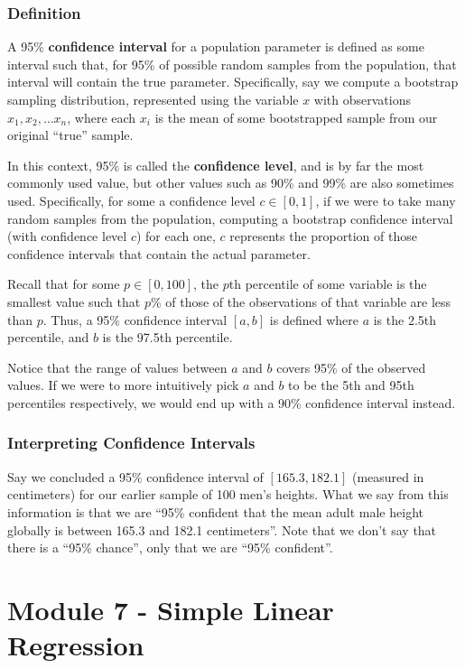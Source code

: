 \documentclass[10pt]{article}
\newenvironment{aside}{\begin{tcolorbox}[colframe=white,colback=_grey2,arc=0pt,outer arc=0pt,breakable]}{\end{tcolorbox}}
\begin{document}
\subsubsection{Definition}
A 95\% \textbf{confidence interval} for a population parameter is defined as some interval such that, for 95\% of possible random samples from the population, that interval will contain the true parameter. Specifically, say we compute a bootstrap sampling distribution, represented using the variable $x$ with observations $x_1,x_2,\dots x_n$, where each $x_i$ is the mean of some bootstrapped sample from our original ``true'' sample. 
\begin{aside}
    In this context, 95\% is called the \textbf{confidence level}, and is by far the most commonly used value, but other values such as 90\% and 99\% are also sometimes used. Specifically, for some a confidence level $c\in[0,1]$, if we were to take many random samples from the population, computing a bootstrap confidence interval (with confidence level $c$) for each one, $c$ represents the proportion of those confidence intervals that contain the actual parameter.
\end{aside}
Recall that for some $p\in[0,100]$, the $p$th percentile of some variable is the smallest value such that $p\%$ of those of the observations of that variable are less than $p$. Thus, a 95\% confidence interval $[a,b]$ is defined where $a$ is the 2.5th percentile, and $b$ is the 97.5th percentile.
\begin{aside}
     Notice that the range of values between $a$ and $b$ covers 95\% of the observed values. If we were to more intuitively pick $a$ and $b$ to be the 5th and 95th percentiles respectively, we would end up with a 90\% confidence interval instead.
\end{aside}
\subsubsection{Interpreting Confidence Intervals}
Say we concluded a 95\% confidence interval of $[165.3, 182.1]$ (measured in centimeters) for our earlier sample of 100 men's heights. What we say from this information is that we are ``95\% confident that the mean adult male height globally is between 165.3 and 182.1 centimeters''. Note that we don't say that there is a ``95\% chance'', only that we are ``95\% confident''.

\section{Module 7 - Simple Linear Regression}
\end{document}
